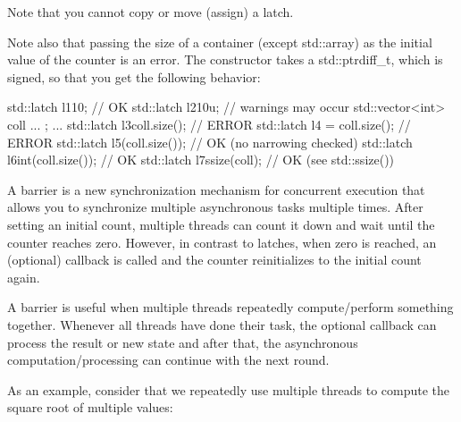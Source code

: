 Note that you cannot copy or move (assign) a latch.

Note also that passing the size of a container (except std::array) as the initial value of the counter is an error. The constructor takes a std::ptrdiff\_t, which is signed, so that you get the following behavior:

\begin{cpp}
std::latch l1{10}; // OK
std::latch l2{10u}; // warnings may occur
std::vector<int> coll{ ... };
...
std::latch l3{coll.size()}; // ERROR
std::latch l4 = coll.size(); // ERROR
std::latch l5(coll.size()); // OK (no narrowing checked)
std::latch l6{int(coll.size())}; // OK
std::latch l7{ssize(coll)}; // OK (see std::ssize())
\end{cpp}


A barrier is a new synchronization mechanism for concurrent execution that allows you to synchronize multiple asynchronous tasks multiple times. After setting an initial count, multiple threads can count it down and wait until the counter reaches zero. However, in contrast to latches, when zero is reached, an (optional) callback is called and the counter reinitializes to the initial count again.

A barrier is useful when multiple threads repeatedly compute/perform something together. Whenever all threads have done their task, the optional callback can process the result or new state and after that, the asynchronous computation/processing can continue with the next round.

As an example, consider that we repeatedly use multiple threads to compute the square root of multiple values:



